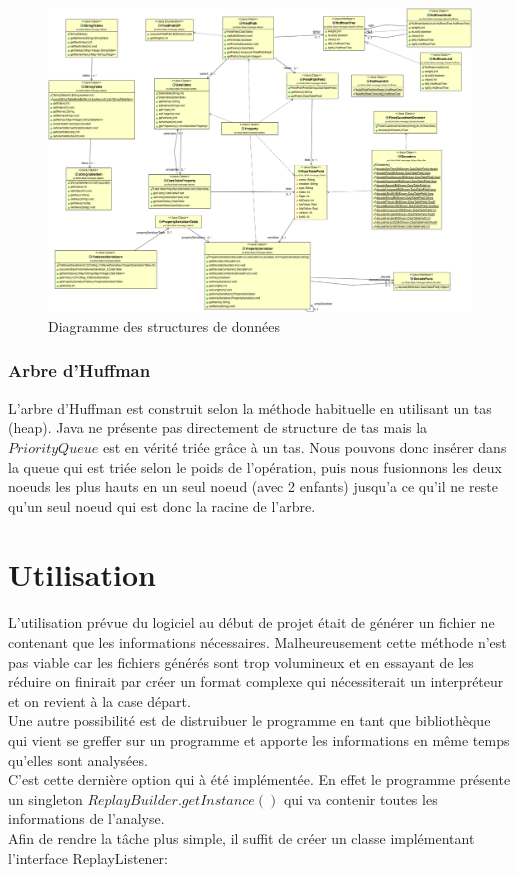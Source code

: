 \documentclass{article}
\begin{document}
\begin{landscape}
\begin{figure}[!htbp]
\centering
\vspace*{-2cm}
\hspace*{-4cm}
\thispagestyle{empty}
\includegraphics[scale=0.40]{ds.png}
\caption{Diagramme des structures de données}
\end{figure}
\end{landscape}

\subsubsection{Arbre d'Huffman}

L'arbre d'Huffman est construit selon la méthode habituelle en utilisant un tas (heap). Java ne présente pas directement de structure de tas mais la $PriorityQueue$ est en vérité triée grâce à un tas. Nous pouvons donc insérer dans la queue qui est triée selon le poids de l'opération, puis nous fusionnons les deux noeuds les plus hauts en un seul noeud (avec 2 enfants) jusqu'a ce qu'il ne reste qu'un seul noeud qui est donc la racine de l'arbre.

\section{Utilisation}

L'utilisation prévue du logiciel au début de projet était de générer un fichier ne contenant que les informations nécessaires. Malheureusement cette méthode n'est pas viable car les fichiers générés sont trop volumineux et en essayant de les réduire on finirait par créer un format complexe qui nécessiterait un interpréteur et on revient à la case départ.\\
Une autre possibilité est de distruibuer le programme en tant que bibliothèque qui vient se greffer sur un programme et apporte les informations en même temps qu'elles sont analysées.\\
C'est cette dernière option qui à été implémentée. En effet le programme présente un singleton $ReplayBuilder.getInstance()$ qui va contenir toutes les informations de l'analyse.\\
Afin de rendre la tâche plus simple, il suffit de créer un classe implémentant l'interface ReplayListener:
\end{document}
